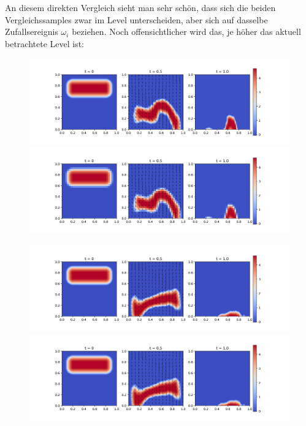 An diesem direkten Vergleich sieht man sehr schön, dass sich die beiden Vergleichssamples zwar im Level unterscheiden, aber sich auf dasselbe Zufallsereignis $ \omega_i $ beziehen. Noch offensichtlicher wird das, je höher das aktuell betrachtete Level ist:
\begin{figure}[H]
	\centering
	\includegraphics[width=\textwidth]{plots/sample_6_0.png} 
	\includegraphics[width=\textwidth]{plots/sample_coarse_6_0.png} 
\end{figure}
\begin{figure}[H]
	\centering
	\includegraphics[width=\textwidth]{plots/sample_7_0.png} 
	\includegraphics[width=\textwidth]{plots/sample_coarse_7_0.png} 
\end{figure}
